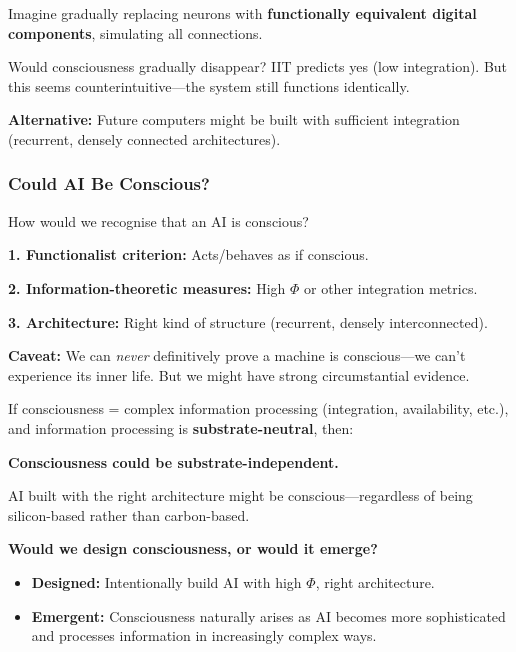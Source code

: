 \begin{exbox}
Imagine gradually replacing neurons with \textbf{functionally equivalent digital components}, simulating all connections.

Would consciousness gradually disappear? IIT predicts yes (low integration). But this seems counterintuitive---the system still functions identically.

\textbf{Alternative:} Future computers might be built with sufficient integration (recurrent, densely connected architectures).
\end{exbox}

\bigseparator

\subsubsection{Could AI Be Conscious?}

\begin{thmbox}
How would we recognise that an AI is conscious?

\textbf{1. Functionalist criterion:} Acts/behaves as if conscious.

\textbf{2. Information-theoretic measures:} High $\Phi$ or other integration metrics.

\textbf{3. Architecture:} Right kind of structure (recurrent, densely interconnected).

\textbf{Caveat:} We can \textit{never} definitively prove a machine is conscious---we can't experience its inner life. But we might have strong circumstantial evidence.
\end{thmbox}

\begin{defbox}
If consciousness = complex information processing (integration, availability, etc.), and information processing is \textbf{substrate-neutral}, then:

\textbf{Consciousness could be substrate-independent.}

AI built with the right architecture might be conscious---regardless of being silicon-based rather than carbon-based.
\end{defbox}

\begin{tipbox}
\textbf{Would we design consciousness, or would it emerge?}
\begin{itemize}
  \item \textbf{Designed:} Intentionally build AI with high $\Phi$, right architecture.
  \item \textbf{Emergent:} Consciousness naturally arises as AI becomes more sophisticated and processes information in increasingly complex ways.
\end{itemize}
\end{tipbox}

